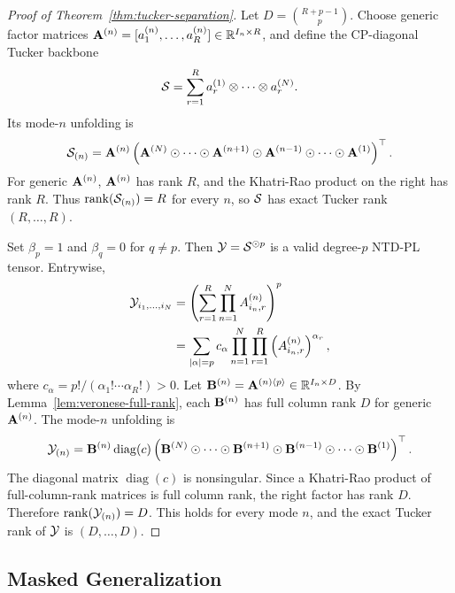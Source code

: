 \begin{proof}[Proof of Theorem~\ref{thm:tucker-separation}]
Let \(D=\binom{R+p-1}{p}\). Choose generic factor matrices
\(\mathbf{A}^{(n)}=[a_1^{(n)},\ldots,a_R^{(n)}]\in\mathbb{R}^{I_n\times R}\), and define
the CP-diagonal Tucker backbone
\begin{equation}
  \mathcal{S}
  =
  \sum_{r=1}^{R}
  a_r^{(1)}\otimes\cdots\otimes a_r^{(N)}.
\end{equation}
Its mode-\(n\) unfolding is
\begin{equation}
  \mathcal{S}_{(n)}
  =
  \mathbf{A}^{(n)}
  \left(
  \mathbf{A}^{(N)}\odot\cdots\odot\mathbf{A}^{(n+1)}
  \odot\mathbf{A}^{(n-1)}\odot\cdots\odot\mathbf{A}^{(1)}
  \right)^\top .
\end{equation}
For generic \(\mathbf{A}^{(n)}\), \(\mathbf{A}^{(n)}\) has rank \(R\), and the Khatri-Rao
product on the right has rank \(R\). Thus
\(\operatorname{rank}(\mathcal{S}_{(n)})=R\) for every \(n\), so \(\mathcal{S}\) has exact
Tucker rank \((R,\ldots,R)\).

Set \(\beta_p=1\) and \(\beta_q=0\) for \(q\ne p\). Then
\(\mathcal{Y}=\mathcal{S}^{\odot p}\) is a valid degree-\(p\) NTD-PL tensor. Entrywise,
\begin{align}
  \mathcal{Y}_{i_1,\ldots,i_N}
  &=
  \left(
  \sum_{r=1}^{R}\prod_{n=1}^{N} A^{(n)}_{i_n,r}
  \right)^p \\
  &=
  \sum_{|\alpha|=p}
  c_\alpha
  \prod_{n=1}^{N}\prod_{r=1}^{R}
  \left(A^{(n)}_{i_n,r}\right)^{\alpha_r},
\end{align}
where \(c_\alpha=p!/(\alpha_1!\cdots\alpha_R!)>0\). Let
\(\mathbf{B}^{(n)}=\mathbf{A}^{(n)\langle p\rangle}\in\mathbb{R}^{I_n\times D}\). By
Lemma~\ref{lem:veronese-full-rank}, each \(\mathbf{B}^{(n)}\) has full column rank
\(D\) for generic \(\mathbf{A}^{(n)}\). The mode-\(n\) unfolding is
\begin{equation}
  \mathcal{Y}_{(n)}
  =
  \mathbf{B}^{(n)}\operatorname{diag}(c)
  \left(
  \mathbf{B}^{(N)}\odot\cdots\odot\mathbf{B}^{(n+1)}
  \odot\mathbf{B}^{(n-1)}\odot\cdots\odot\mathbf{B}^{(1)}
  \right)^\top .
\end{equation}
The diagonal matrix \(\operatorname{diag}(c)\) is nonsingular. Since a
Khatri-Rao product of full-column-rank matrices is full column rank, the
right factor has rank \(D\). Therefore \(\operatorname{rank}(\mathcal{Y}_{(n)})=D\).
This holds for every mode \(n\), and the exact Tucker rank of \(\mathcal{Y}\) is
\((D,\ldots,D)\).
\end{proof}

\subsection{Masked Generalization}
\label{app:masked-generalization}

